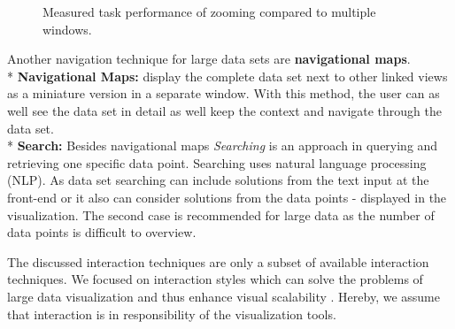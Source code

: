 \begin{figure}[H]
    \centering
    \caption{Measured task performance of zooming compared to multiple windows.  \cite{Ware2012a}}
    \label{fig:zoomVsMultiWindow}
\end{figure}

Another navigation technique for large data sets are \textbf{navigational maps}.\\*
\textbf{Navigational Maps: } display the complete data set next to other linked views as a miniature version in a separate window. With this method, the user can as well see the data set in detail as well keep the context and navigate through the data set.\\*
\textbf{Search: }\label{search} Besides navigational maps \textit{Searching} is an approach in querying and retrieving one specific data point. Searching uses natural language processing (NLP). As data set searching can include solutions from the text input at the front-end or it also can consider solutions from the data points - displayed in the visualization. The second case is recommended for large data as the number of data points is difficult to overview.
\par

The discussed interaction techniques are only a subset of available interaction techniques. We focused on interaction styles which can solve the problems of large data visualization and thus enhance visual scalability  \cite{Tegarden1999}. Hereby, we assume that interaction is in responsibility of the visualization tools.


